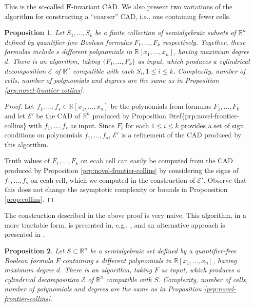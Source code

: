 \documentclass[
]{book}
\newtheorem{proposition}{Proposition}[chapter]
\theoremstyle{definition}
\theoremstyle{definition}
\theoremstyle{definition}
\theoremstyle{definition}
\theoremstyle{remark}
\begin{document}
This is the so-called \(\mathbf{F}\)-invariant CAD. We also present two variations of the algorithm for constructing a ``coarser'' CAD, i.e., one containing fewer cells.

\begin{proposition}
\protect\hypertarget{prp:novel-frontier-collins-sets}{}\label{prp:novel-frontier-collins-sets}Let \(S_1,\ldots,S_k\) be a finite collection of semialgebraic subsets of \(\mathbb{R}^n\) defined by quantifier-free Boolean formulas \(F_1,\ldots,F_k\) respectively. Together, these formulas include \(s\) different polynomials in \(\mathbb{R}[x_1,\ldots,x_n]\), having maximum degree \(d\).
There is an algorithm, taking \(\{F_1,\ldots,F_k\}\) as input, which produces a cylindrical decomposition \(\mathcal E\) of \(\mathbb{R}^n\) compatible with each \(S_i, 1 \le i \le k\).
Complexity, number of cells, number of polynomials and degrees are the same as in Proposition \ref{prp:novel-frontier-collins}.
\end{proposition}

\begin{proof}
Let \(f_1,\ldots,f_s \in \mathbb{R}[x_1,\ldots,x_n]\) be the polynomials from formulas \(F_1,\ldots,F_k\) and let \(\mathcal{E}'\) be the CAD of \(\mathbb{R}^n\) produced by Proposition @ref\{prp:novel-frontier-collins\} with \(f_1,\ldots,f_s\) as input. Since \(F_i\) for each \(1\le i\le k\) provides a set of sign conditions on polynomials \(f_1,\ldots,f_s\), \(\mathcal{E}'\) is a refinement of the CAD produced by this algorithm.

Truth values of \(F_1,\ldots,F_k\) on ecah cell can easily be computed from the CAD produced by Proposition \ref{prp:novel-frontier-collins} by considering the signs of \(f_1,\ldots,f_s\) on ecah cell, which we computed in the construction of \(\mathcal{E}'\).
Observe that this does not change the asymptotic complexity or bounds in Propoosition \ref{prop:collins}.
\end{proof}

The construction described in the above proof is very naive. This algorithm, in a more tractable form, is presented in, e.g., \citet{collins1991}, and an alternative approach is presented in \citet{bradford2014}.

\begin{proposition}
\protect\hypertarget{prp:novel-frontier-collins-one-set}{}\label{prp:novel-frontier-collins-one-set}Let \(S\subset \mathbb{R}^n\) be a semialgebraic set defined by a quantifier-free Boolean formula \(F\) containing \(s\) different polynomials in \(\mathbb{R}[x_1,\ldots,x_n]\), having maximum degree \(d\).
There is an algorithm, taking \(F\) as input, which produces a cylindrical decomposition \(\mathcal E\) of \(\mathbb{R}^n\) compatible with \(S\).
Complexity, number of cells, number of polynomials and degrees are the same as in Proposition \ref{prp:novel-frontier-collins}.
\end{proposition}
\end{document}
